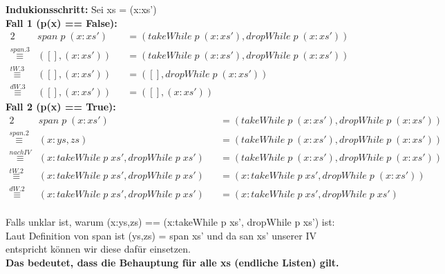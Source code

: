 \documentclass[11pt]{article}
\begin{document}
\begin{enumerate}
\vspace*{0.5cm}
\textbf{Indukionsschritt:} Sei xs = (x:xs')\\
\phantom{Kriegel}\textbf{Fall 1 (p(x) == False):}
\begin{alignat*}{2}
&span\phantom{.}p\phantom{.}(x:xs')&&=(takeWhile\phantom{.}p\phantom{.}(x:xs'),dropWhile\phantom{.}p\phantom{.}(x:xs'))\\
\stackrel{span.3}{\equiv}&([],(x:xs'))&&=(takeWhile\phantom{.}p\phantom{.}(x:xs'),dropWhile\phantom{.}p\phantom{.}(x:xs'))\\
\stackrel{tW.3}{\equiv}&([],(x:xs'))&&=([],dropWhile\phantom{.}p\phantom{.}(x:xs'))\\
\stackrel{dW.3}{\equiv}&([],(x:xs'))&&=([],(x:xs'))
\end{alignat*}
\phantom{Kriegel}\textbf{Fall 2 (p(x) == True):}
\begin{alignat*}{2}
&span\phantom{.}p\phantom{.}(x:xs')&&=(takeWhile\phantom{.}p\phantom{.}(x:xs'),dropWhile\phantom{.}p\phantom{.}(x:xs'))\\
\stackrel{span.2}{\equiv}&(x:ys,zs)&&=(takeWhile\phantom{.}p\phantom{.}(x:xs'),dropWhile\phantom{.}p\phantom{.}(x:xs'))\\
\stackrel{nach IV}{\equiv}&(x:takeWhile\phantom{.}p\phantom{.}xs',dropWhile\phantom{.}p\phantom{.}xs')&&=(takeWhile\phantom{.}p\phantom{.}(x:xs'),dropWhile\phantom{.}p\phantom{.}(x:xs'))\\
\stackrel{tW.2}{\equiv}&(x:takeWhile\phantom{.}p\phantom{.}xs',dropWhile\phantom{.}p\phantom{.}xs')&&=(x:takeWhile\phantom{.}p\phantom{.}xs',dropWhile\phantom{.}p\phantom{.}(x:xs'))\\
\stackrel{dW.2}{\equiv}&(x:takeWhile\phantom{.}p\phantom{.}xs',dropWhile\phantom{.}p\phantom{.}xs')&&=(x:takeWhile\phantom{.}p\phantom{.}xs',dropWhile\phantom{.}p\phantom{.}xs')
\end{alignat*}\\
Falls unklar ist, warum (x:ys,zs) == (x:takeWhile p xs', dropWhile p xs') ist: Laut Definition von span ist (ys,zs) = span xs' und da san xs' unserer IV entspricht können wir diese dafür einsetzen.\\
\vspace*{0.5cm}
\textbf{Das bedeutet, dass die Behauptung für alle xs (endliche Listen) gilt.}


\end{enumerate}
\end{document}
